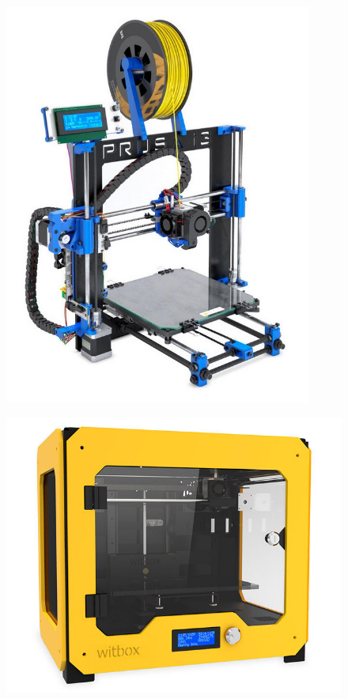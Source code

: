 \begin{figure}[h]
\centering
\begin{minipage}{.52\textwidth}
  \centering
  \includegraphics[width=0.9\textwidth]{Figures/hephestos}
  \label{fig:hephestos}
\end{minipage}%
\begin{minipage}{.48\textwidth}
  \centering
  \includegraphics[width=1\textwidth]{Figures/witbox}
  \label{fig:witbox}
\end{minipage}
\end{figure}

